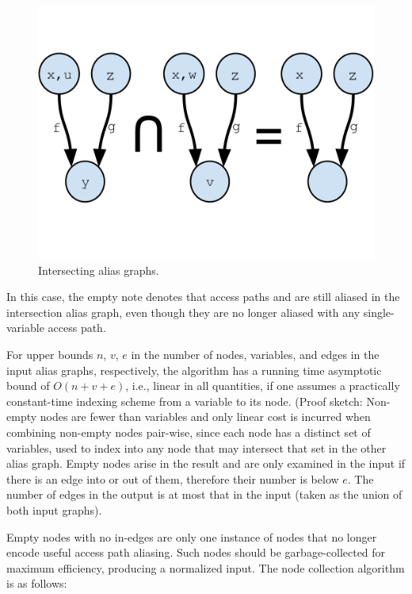 \begin{figure}[ht]
\centering
\includegraphics[trim={0mm 40mm 0mm 30mm},clip,width=0.9\linewidth]{assets/must-data/intersecting-alias-graphs.pdf}
\caption{Intersecting alias graphs.}
\label{fig:must-data:intersection}
\end{figure}

In this case, the empty note denotes that access paths  and  are still aliased in the intersection alias graph, even though they are no longer aliased with any single-variable access path.

For upper bounds $n$, $v$, $e$ in the number of nodes, variables, and edges in the input alias graphs, respectively, the algorithm has a running time asymptotic bound of $O(n + v + e)$, i.e., linear in all
quantities, if one assumes a practically constant-time indexing scheme from a variable to its node. (Proof sketch: Non-empty nodes are fewer than variables and only linear cost is incurred when combining non-empty nodes pair-wise, since each node has a distinct set of variables, used to index into any node that may intersect that set in the other alias graph. Empty nodes arise in the result and are only examined in the input if there is an edge into or out of them, therefore their number is below $e$. The number of edges in the output is at most that in the input (taken as the union of both input graphs).

Empty nodes with no in-edges are only one instance of nodes that no longer encode useful access path aliasing. Such nodes should be garbage-collected for maximum efficiency, producing a normalized input. The node collection algorithm is as follows:


